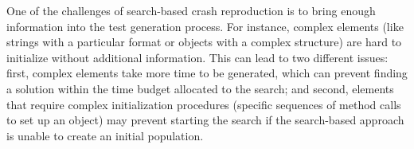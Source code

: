 



%
%


One of the challenges of search-based crash reproduction is to bring enough information into the test generation process.
For instance, complex elements (like strings with a particular format or objects with a complex structure) are hard to initialize without additional information. 
This can lead to two different issues: first, complex elements take more time to be generated, which can prevent finding a solution within the time budget allocated to the search; and second, elements that require complex initialization procedures (\eg specific sequences of method calls to set up an object) may prevent starting the search if the search-based approach is unable to create an initial population. 

